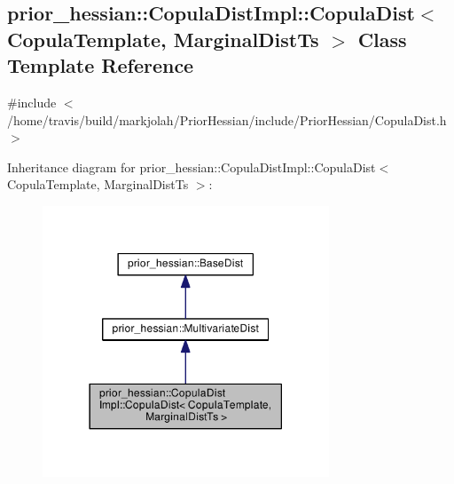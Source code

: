 \hypertarget{classprior__hessian_1_1CopulaDistImpl_1_1CopulaDist}{}\subsection{prior\+\_\+hessian\+:\+:Copula\+Dist\+Impl\+:\+:Copula\+Dist$<$ Copula\+Template, Marginal\+Dist\+Ts $>$ Class Template Reference}
\label{classprior__hessian_1_1CopulaDistImpl_1_1CopulaDist}


{\ttfamily \#include $<$/home/travis/build/markjolah/\+Prior\+Hessian/include/\+Prior\+Hessian/\+Copula\+Dist.\+h$>$}



Inheritance diagram for prior\+\_\+hessian\+:\+:Copula\+Dist\+Impl\+:\+:Copula\+Dist$<$ Copula\+Template, Marginal\+Dist\+Ts $>$\+:\nopagebreak
\begin{figure}[H]
\begin{center}
\leavevmode
\includegraphics[width=242pt]{classprior__hessian_1_1CopulaDistImpl_1_1CopulaDist__inherit__graph}
\end{center}
\end{figure}


